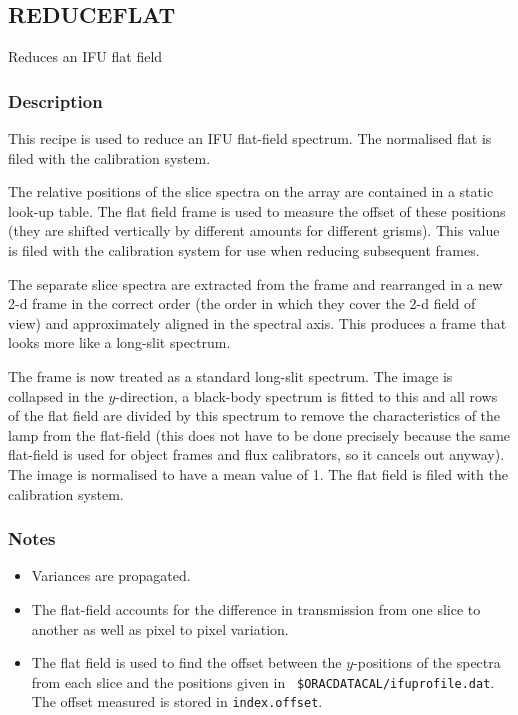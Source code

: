 \documentclass[twoside,11pt]{article}
\renewcommand{\_}{\texttt{\symbol{95}}}
\begin{document}
\clearpage


\subsection{REDUCE\_FLAT}

Reduces an IFU flat field

\subsubsection*{Description}

This recipe is used to reduce an IFU flat-field spectrum. The
normalised flat is filed with the calibration system.

The relative positions of the slice spectra on the array are contained
in a static look-up table. The flat field frame is used to measure the
offset of these positions (they are shifted vertically by different
amounts for different grisms). This value is filed with the calibration
system for use when reducing subsequent frames.

The separate slice spectra are extracted from the frame and rearranged
in a new 2-d frame in the correct order (the order in which they cover
the 2-d field of view) and approximately aligned in the spectral axis. This
produces a frame that looks more like a long-slit spectrum.

The frame is now treated as a standard long-slit spectrum. The image
is collapsed in the $y$-direction, a black-body spectrum is fitted to
this and all rows of the flat field are divided by this spectrum to
remove the characteristics of the lamp from the flat-field (this does
not have to be done precisely because the same flat-field is used for
object frames and flux calibrators, so it cancels out anyway). The
image is normalised to have a mean value of 1.  The flat field is
filed with the calibration system.




\subsubsection*{Notes}
\begin{itemize}

\item

Variances are propagated.

\item

The flat-field accounts for the difference in transmission from one
slice to another as well as pixel to pixel variation.

\item

  The flat field is used to find the offset between the $y$-positions
  of the spectra from each slice and the positions given in {\tt
    \$ORAC\_DATA\_CAL/ifu\_profile.dat}. The offset measured is stored
  in {\tt index.offset}.

\end{itemize}
\end{document}
